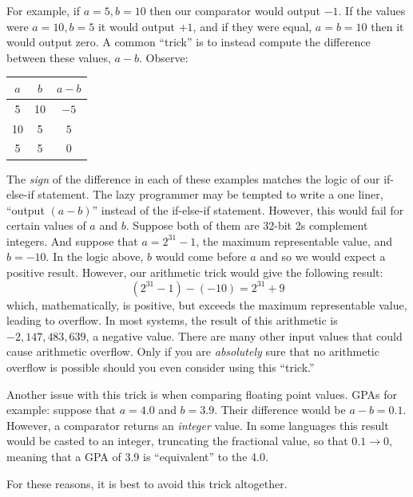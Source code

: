 \begin{algorithm}[H]
\end{algorithm}

For example, if $a = 5, b = 10$ then our comparator would output $-1$.  If
the values were $a = 10, b = 5$ it would output $+1$, and if they were
equal, $a = b = 10$ then it would output zero.  A common ``trick'' is to
instead compute the difference between these values, $a - b$.  Observe:

\begin{center}
\begin{tabular}{ccc}
$a$ & $b$ & $a - b$ \\
\hline\hline
5 & 10 & $-5$ \\
10 & 5 & $5$ \\
5 & 5 & $0$ \\
\end{tabular}
\end{center}

The \emph{sign} of the difference in each of these examples matches the 
logic of our if-else-if statement.  The lazy programmer may be tempted to
write a one liner, ``output $(a - b)$'' instead of the if-else-if statement.
However, this would fail for certain values of $a$ and $b$.  Suppose 
both of them are 32-bit 2s complement integers.  And suppose that 
$a = 2^{31} - 1$, the maximum representable value, and $b = -10$.  In
the logic above, $b$ would come before $a$ and so we would expect a 
positive result.  However, our arithmetic trick would give the following 
result:
  $$(2^{31} - 1) - (-10) = 2^{31} + 9$$
which, mathematically, is positive, but exceeds the maximum representable
value, leading to overflow.  In most systems, the result of this arithmetic
is $-2,147,483,639$, a negative value.  There are many other input values
that could cause arithmetic overflow.  Only if you are \emph{absolutely} 
sure that no arithmetic overflow is possible should you even consider
using this ``trick.''

Another issue with this trick is when comparing floating point values.
GPAs for example: suppose that $a = 4.0$ and $b = 3.9$.  Their difference
would be $a - b = 0.1$.  However, a comparator returns an \emph{integer}
value.  In some languages this result would be casted to an integer, 
truncating the fractional value, so that $0.1 \rightarrow 0$, meaning
that a GPA of 3.9 is ``equivalent'' to the 4.0.  

For these reasons, it is best to avoid this trick altogether.

